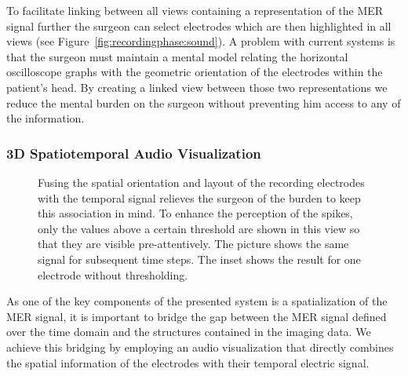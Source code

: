 \documentclass{vgtc}                          %
\begin{document}
To facilitate linking between all views containing a representation of the MER signal further the surgeon can select electrodes which are then highlighted in all views (see Figure~\ref{fig:recordingphase:sound}). A problem with current systems is that the surgeon must maintain a mental model relating the horizontal oscilloscope graphs with the geometric orientation of the electrodes within the patient's head. By creating a linked view between those two representations we reduce the mental burden on the surgeon without preventing him access to any of the information.

\subsubsection{3D Spatiotemporal Audio Visualization}\label{sec:overview:recording:3daudio}
\begin{figure}[t]
    \centering
    \caption{Fusing the spatial orientation and layout of the recording electrodes with the temporal signal relieves the surgeon of the burden to keep this association in mind. To enhance the perception of the spikes, only the values above a certain threshold are shown in this view so that they are visible pre-attentively. The picture shows the same signal for subsequent time steps. The inset shows the result for one electrode without thresholding.}
    \label{fig:recordingphase:3dsound}
\end{figure}

As one of the key components of the presented system is a spatialization of the MER signal, it is important to bridge the gap between the MER signal defined over the time domain and the structures contained in the imaging data. We achieve this bridging by employing an audio visualization that directly combines the spatial information of the electrodes with their temporal electric signal. %
\end{document}

